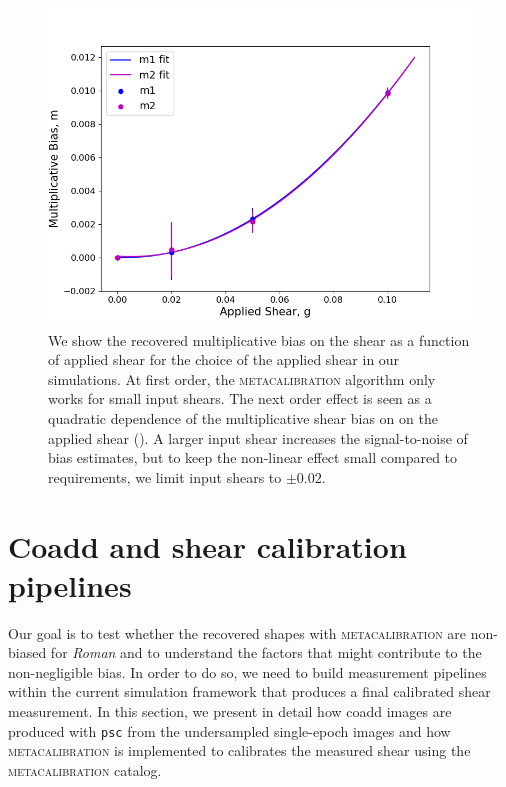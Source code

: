 \documentclass[fleqn,usenatbib]{mnras}
\begin{document}
\begin{figure}
	\includegraphics[width=\columnwidth]{metacal_bias_shear.png}
    \caption{We show the recovered multiplicative bias on the shear as a function of applied shear for the choice of the applied shear in our simulations. At first order, the \textsc{metacalibration} algorithm only works for small input shears. The next order effect is seen as a quadratic dependence of the multiplicative shear bias on on the applied shear (\citealt{2017ApJ...841...24S}). A larger input shear increases the signal-to-noise of bias estimates, but to keep the non-linear effect small compared to requirements, we limit input shears to $\pm 0.02$. }
    \label{fig:metacal_shear_linear}
\end{figure}


\section{Coadd and shear calibration pipelines}
\label{sec:methods}
Our goal is to test whether the recovered shapes with \textsc{metacalibration} are non-biased for \emph{Roman} and to understand the factors that might contribute to the non-negligible bias. In order to do so, we need to build measurement pipelines within the current simulation framework that produces a final calibrated shear measurement. In this section, we present in detail how coadd images are produced with \texttt{psc} from the undersampled single-epoch images and how \textsc{metacalibration} is implemented to calibrates the measured shear using the \textsc{metacalibration} catalog. 
\end{document}
